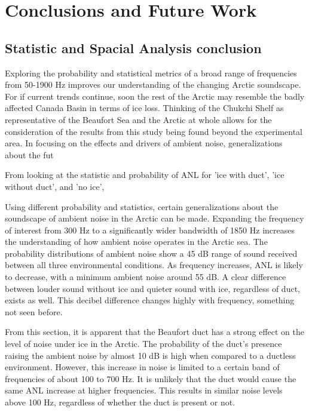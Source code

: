
\chapter{Conclusions and Future Work}

\section{Statistic and Spacial Analysis conclusion}

Exploring the probability and statistical metrics of a broad range of frequencies from 50-1900 Hz improves our understanding of the changing Arctic soundscape. For if current trends continue, soon the rest of the Arctic may resemble the badly affected Canada Basin in terms of ice loss. Thinking of the Chukchi Shelf as representative of the Beaufort Sea and the Arctic at whole allows for the consideration of the results from this study being found beyond the experimental area.  In focusing on the effects and drivers of ambient noise, generalizations about the fut

From looking at the statistic and probability of ANL for 'ice with duct', 'ice without duct', and 'no ice', 

Using different probability and statistics, certain generalizations about the soundscape of ambient noise in the Arctic can be made. Expanding the frequency of interest from 300 Hz to a significantly wider bandwidth of 1850 Hz increases the understanding of how ambient noise operates in the Arctic sea. The probability distributions of ambient noise show a 45 dB range of sound received between all three environmental conditions. As frequency increases, ANL is likely to decrease, with a minimum ambient noise around 55 dB. A clear difference between louder sound without ice and quieter sound with ice, regardless of duct, exists as well. This decibel difference changes highly with frequency, something not seen before.

From this section, it is apparent that the Beaufort duct has a strong effect on the level of noise under ice in the Arctic. The probability of the duct's presence raising the ambient noise by almost 10 dB is high when compared to a ductless environment. However, this increase in noise is limited to a certain band of frequencies of about 100 to 700 Hz. It is unlikely that the duct would cause the same ANL increase at higher frequencies. This results in similar noise levels above 100 Hz, regardless of whether the duct is present or not.

